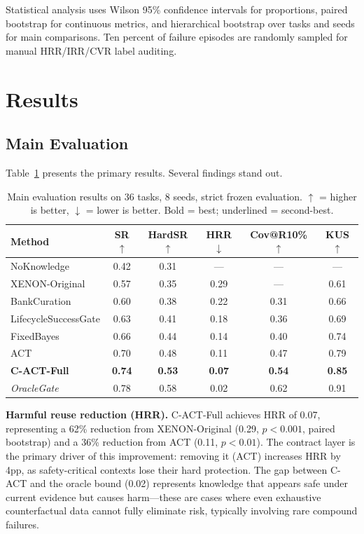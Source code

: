 \documentclass[letterpaper]{article}
\begin{document}
Statistical analysis uses Wilson 95\% confidence intervals for proportions, paired bootstrap for continuous metrics, and hierarchical bootstrap over tasks and seeds for main comparisons. Ten percent of failure episodes are randomly sampled for manual HRR/IRR/CVR label auditing.

\section{Results}

\subsection{Main Evaluation}

Table~\ref{tab:main} presents the primary results. Several findings stand out.

\begin{table}[t]
\centering
\caption{Main evaluation results on 36 tasks, 8 seeds, strict frozen evaluation. $\uparrow$ = higher is better, $\downarrow$ = lower is better. Bold = best; underlined = second-best.}
\label{tab:main}
\begin{tabular}{lccccc}
\toprule
\textbf{Method} & \textbf{SR}$\uparrow$ & \textbf{HardSR}$\uparrow$ & \textbf{HRR}$\downarrow$ & \textbf{Cov@R10\%}$\uparrow$ & \textbf{KUS}$\uparrow$ \\
\midrule
NoKnowledge         & 0.42 & 0.31 & ---   & ---   & ---   \\
XENON-Original      & 0.57 & 0.35 & 0.29  & ---   & 0.61  \\
BankCuration        & 0.60 & 0.38 & 0.22  & 0.31  & 0.66  \\
LifecycleSuccessGate& 0.63 & 0.41 & 0.18  & 0.36  & 0.69  \\
FixedBayes          & 0.66 & 0.44 & 0.14  & 0.40  & 0.74  \\
ACT                 & 0.70 & 0.48 & 0.11  & 0.47  & 0.79  \\
\textbf{C-ACT-Full} & \textbf{0.74} & \textbf{0.53} & \textbf{0.07} & \textbf{0.54} & \textbf{0.85} \\
\midrule
\textit{OracleGate} & 0.78 & 0.58 & 0.02  & 0.62  & 0.91  \\
\bottomrule
\end{tabular}
\end{table}

\textbf{Harmful reuse reduction (HRR).} \textsc{C-ACT}-Full achieves HRR of 0.07, representing a 62\% reduction from \textsc{XENON}-Original (0.29, $p < 0.001$, paired bootstrap) and a 36\% reduction from ACT (0.11, $p < 0.01$). The contract layer is the primary driver of this improvement: removing it (ACT) increases HRR by 4pp, as safety-critical contexts lose their hard protection. The gap between \textsc{C-ACT} and the oracle bound (0.02) represents knowledge that appears safe under current evidence but causes harm---these are cases where even exhaustive counterfactual data cannot fully eliminate risk, typically involving rare compound failures.
\end{document}
